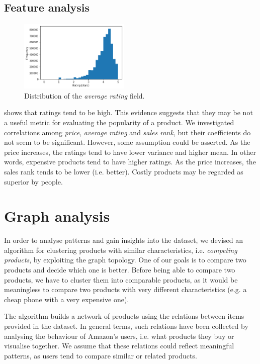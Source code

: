 \documentclass[11pt]{article}
\begin{document}
\subsection{Feature analysis}
\begin{figure}[h]
	\centering{}
	\includegraphics[width=0.47\textwidth]{img/avgReviews.png}
	\caption{Distribution of the \textit{average rating} field.}
	\label{fig:avgdist}
\end{figure}
 shows that ratings tend to be high. This evidence suggests that they may be not a useful metric for evaluating the popularity of a product.
We investigated correlations among \textit{price}, \textit{average rating} and \textit{sales rank}, but their coefficients do not seem to be significant. However, some assumption could be asserted. As the price increases, the ratings tend to have lower variance and higher mean. In other words, expensive products tend to have higher ratings.
As the price increases, the sales rank tends to be lower (i.e. better). Costly products may be regarded as superior by people. 

\section{Graph analysis}
\label{sec:graphanalysis}
In order to analyse patterns and gain insights into the dataset, we devised an algorithm for clustering products with similar characteristics, i.e. \textit{competing products}, by exploiting the graph topology. One of our goals is to compare two products and decide which one is better. Before being able to compare two products, we have to cluster them into comparable products, as it would be meaningless to compare two products with very different characteristics (e.g. a cheap phone with a very expensive one).

The algorithm builds a network of products using the relations between items provided in the dataset. In general terms, such relations have been collected by analysing the behaviour of Amazon's users, i.e. what products they buy or visualise together. We assume that these relations could reflect meaningful patterns, as users tend to compare similar or related products.
\end{document}
